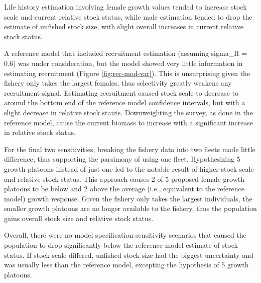 \documentclass[11pt,
  english,
  a4paper,
]{article}
\begin{document}
\leavevmode\tagmcend\tagstructend\par


Life history estimation involving female growth values tended to increase stock scale and current relative stock status, while male estimation tended to drop the estimate of unfished stock size, with slight overall increases in current relative stock status.

\leavevmode\tagmcend\tagstructend\par


A reference model that included recruitment estimation (assuming sigma\_R = 0.6) was under consideration, but the model showed very little information in estimating recruitment (Figure \ref{fig:rec-mod-var}). This is unsurprising given the fishery only takes the largest females, thus selectivity greatly weakens any recruitment signal. Estimating recruitment caused stock scale to decrease to around the bottom end of the reference model confidence intervals, but with a slight decrease in relative stock stauts. Downweighting the survey, as done in the reference model, cause the current biomass to increase with a significant increase in relative stock status.

\leavevmode\tagmcend\tagstructend\par


For the final two sensitivities, breaking the fishery data into two fleets made little difference, thus supporting the parsimony of using one fleet. Hypothesizing 5 growth platoons instead of just one led to the notable result of higher stock scale and relative stock status. This approach causes 2 of 5 proposed female growth platoons to be below and 2 above the average (i.e., equivalent to the reference model) growth response. Given the fishery only takes the largest individuals, the smaller growth platoons are no longer available to the fishery, thus the population gains overall stock size and relative stock status.

\leavevmode\tagmcend\tagstructend\par


Overall, there were no model specification sensitivity scenarios that caused the population to drop significantly below the reference model estimate of stock status. If stock scale differed, unfished stock size had the biggest uncertainty and was usually less than the reference model, excepting the hypothesis of 5 growth platoons.
\end{document}
